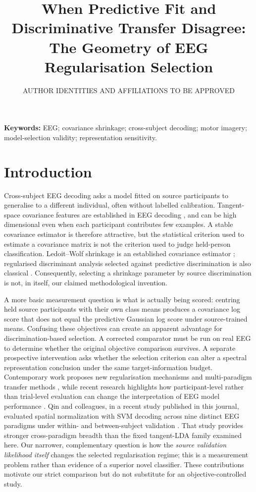 \documentclass[11pt,a4paper]{article}
\title{When Predictive Fit and Discriminative Transfer Disagree:\\
The Geometry of EEG Regularisation Selection}
\author{AUTHOR IDENTITIES AND AFFILIATIONS TO BE APPROVED}
\date{}
\begin{document}
\maketitle

\noindent\textbf{Keywords:} EEG; covariance shrinkage; cross-subject decoding;
motor imagery; model-selection validity; representation sensitivity.

\section{Introduction}
Cross-subject EEG decoding asks a model fitted on source participants to
generalise to a different individual, often without labelled calibration.
Tangent-space covariance features are established in EEG decoding
\cite{barachant2012riemannian}, and can be high dimensional even
when each participant contributes few examples. A stable covariance estimator is therefore
attractive, but the statistical criterion used to estimate a covariance
matrix is not the criterion used to judge held-person classification.
Ledoit--Wolf shrinkage is an established covariance estimator
\cite{ledoit2004}; regularised discriminant analysis selected against
predictive discrimination is also classical \cite{friedman1989}.
Consequently, selecting a shrinkage parameter by source discrimination
is not, in itself, our claimed methodological invention.

A more basic measurement question is what is actually being scored:
centring held source participants with their own class means produces a
covariance log score that does not equal the predictive Gaussian log score
under source-trained means. Confusing these objectives can create an
apparent advantage for discrimination-based selection. A corrected
comparator must be run on real EEG to determine whether the original
objective comparison survives. A separate prospective intervention asks
whether the selection criterion can alter a spectral representation
conclusion under the same target-information budget. Contemporary work proposes
new regularisation mechanisms and multi-paradigm transfer methods
\cite{miao2025freezing,morvay2026wbt,he2026cyclic}, while recent research highlights
how participant-level rather than trial-level evaluation can change the
interpretation of EEG model performance \cite{gil2026subjectvalidation}.
Qin and colleagues, in a recent study published in this journal,
evaluated spatial normalization with SVM decoding across nine
distinct EEG paradigms under within- and between-subject validation
\cite{qin2026spatialnorm}. That study provides stronger
cross-paradigm breadth than the fixed tangent-LDA family examined here.
Our narrower, complementary question is how the \emph{source
validation likelihood itself} changes the selected
regularisation regime; this is a measurement problem rather
than evidence of a superior novel classifier.
These contributions motivate our strict comparison but do not substitute
for an objective-controlled study.
\end{document}
